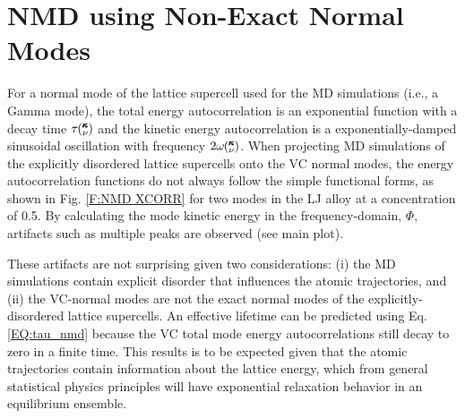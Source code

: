 \documentclass[12pt,twocolumn,iop]{/usr/share/texmf-texlive/tex/latex/iop/iopart}[/usr/share/texmf-texlive/tex/latex/iop/]
\newcommand{\kv}{\mspace{-4.0mu}\left(\mspace{-8.0mu}
\begin{smallmatrix}&\pmb{\kappa} \\&\nu\end{smallmatrix}
\mspace{-3.0mu}\right)}
\begin{document}

\section{\label{A:NMD XCORR}
NMD using Non-Exact Normal Modes}

For a normal mode of the lattice supercell 
used for the MD simulations (i.e., a Gamma mode), 
the total energy autocorrelation is an exponential function  
with a decay time $\tau\kv$ and the kinetic energy autocorrelation is a 
exponentially-damped sinusoidal oscillation with frequency 
$2\omega\kv$.\cite{mcgaughey_predicting_2013} 
When projecting MD simulations  
of the explicitly disordered lattice supercells 
onto the VC normal modes, 
the energy autocorrelation functions 
do not always follow the simple functional forms, 
as shown in Fig. \ref{F:NMD XCORR} for two modes in the LJ alloy at a 
concentration of 0.5.  
By calculating the mode kinetic energy in the  
frequency-domain, $\Phi$,\cite{larkin_comparison_2012} artifacts such as 
multiple peaks are observed (see main plot).   

These artifacts are not surprising given two considerations: 
(i) the MD simulations 
contain explicit disorder that influences the atomic trajectories, 
and (ii) the VC-normal modes are not the exact normal modes of the 
explicitly-disordered lattice supercells. 
An effective lifetime can be predicted 
using Eq. \eqref{EQ:tau_nmd} 
because the VC total mode energy autocorrelations 
still decay to zero in a finite time. This results is to be expected 
given that the atomic trajectories contain 
information about the lattice energy, which from general statistical 
physics principles will have exponential relaxation behavior in an 
equilibrium ensemble.
\cite{landau_statistical_1980,srivastava_physics_1990,
rajabpour_thermal_2010}
\end{document}

